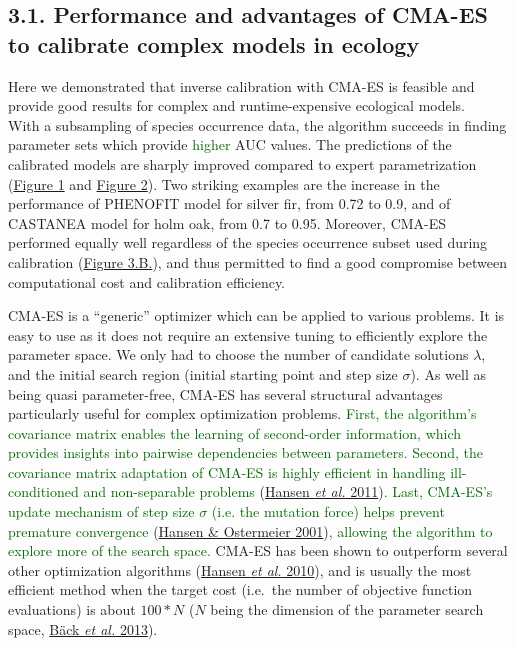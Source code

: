 \documentclass[11pt,]{article}
\begin{document}
\hypertarget{performance-and-advantages-of-cma-es-to-calibrate-complex-models-in-ecology}{%
\subsection{3.1. Performance and advantages of CMA-ES to calibrate
complex models in
ecology}\label{performance-and-advantages-of-cma-es-to-calibrate-complex-models-in-ecology}}

Here we demonstrated that inverse calibration with CMA-ES is feasible
and provide good results for complex and runtime-expensive ecological
models.\\
With a subsampling of species occurrence data, the algorithm succeeds in
finding parameter sets which provide \textcolor{darkgreen}{higher} AUC
values. The predictions of the calibrated models are sharply improved
compared to expert parametrization
(\hyperref[fig:phenofitmaps]{Figure 1} and
\hyperref[fig:castaneamaps]{Figure 2}). Two striking examples are the
increase in the performance of PHENOFIT model for silver fir, from 0.72
to 0.9, and of CASTANEA model for holm oak, from 0.7 to 0.95. Moreover,
CMA-ES performed equally well regardless of the species occurrence
subset used during calibration
(\hyperref[fig:cmaesrepAUCcal]{Figure 3.B.}), and thus permitted to find
a good compromise between computational cost and calibration efficiency.

CMA-ES is a ``generic'' optimizer which can be applied to various
problems. It is easy to use as it does not require an extensive tuning
to efficiently explore the parameter space. We only had to choose the
number of candidate solutions \(\lambda\), and the initial search region
(initial starting point and step size \(\sigma\)). As well as being
quasi parameter-free, CMA-ES has several structural advantages
particularly useful for complex optimization problems.
\textcolor{darkgreen}{First, the algorithm's covariance matrix enables the learning of second-order information, which provides insights into pairwise dependencies between parameters. Second, the covariance matrix adaptation of CMA-ES is highly efficient in handling ill-conditioned and non-separable problems }(\protect\hyperlink{ref-Hansen2011}{Hansen
\emph{et al.}
2011})\textcolor{darkgreen}{. Last, CMA-ES's update mechanism of step size $\sigma$ (i.e. the mutation force) helps prevent premature convergence }(\protect\hyperlink{ref-Hansen2001}{Hansen
\& Ostermeier
2001})\textcolor{darkgreen}{, allowing the algorithm to explore more of the search space.}
CMA-ES has been shown to outperform several other optimization
algorithms (\protect\hyperlink{ref-Hansen2010}{Hansen \emph{et al.}
2010}), and is usually the most efficient method when the target cost
(i.e.~the number of objective function evaluations) is about \(100*N\)
(\(N\) being the dimension of the parameter search space,
\protect\hyperlink{ref-Baeck2013}{Bäck \emph{et al.} 2013}).
\end{document}
